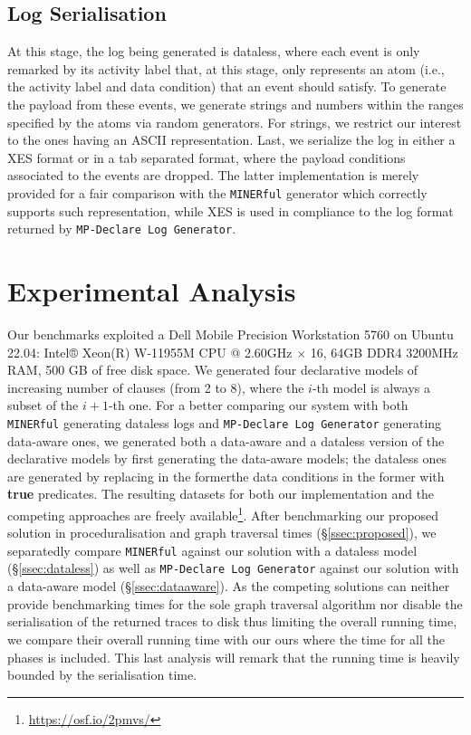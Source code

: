 \documentclass[sigconf]{acmart}
\begin{document}
\subsection{Log Serialisation}\label{sec:loggen}
At this stage, the log being generated is dataless, where each event is only remarked by its activity label that, at this stage, only represents an atom (i.e., the activity label and data condition) that an event should satisfy. To generate the payload from these events, we generate strings and numbers within the ranges specified by the atoms via random generators. For strings, we restrict our interest to the ones having an ASCII representation. Last, we serialize the log in either a XES format or in a tab separated format, where the payload conditions associated to the events are dropped. The latter implementation is merely provided for a fair comparison with the \texttt{MINERful} generator which correctly supports such representation, while XES is used in compliance to the log format returned by \texttt{MP-Declare Log Generator}.

\section{Experimental Analysis}\label{sec:exp}
Our benchmarks exploited a Dell Mobile Precision Workstation 5760 on Ubuntu 22.04: Intel® Xeon(R) W-11955M CPU @ 2.60GHz $\times$ 16, 64GB DDR4 3200MHz RAM, 500 GB of free disk space. We generated four declarative models of increasing number of clauses (from 2 to 8), where the $i$-th model is always a subset of the $i+1$-th one. For a better comparing our system with both \texttt{MINERful} generating dataless logs and
\texttt{MP-Declare Log Generator} generating data-aware ones, we generated both a data-aware and a dataless version of the declarative models by first generating the data-aware models; the dataless ones are generated by replacing in the formerthe data conditions in the former with \textbf{true} predicates. The resulting datasets for both our implementation and the competing approaches are freely available\footnote{\url{https://osf.io/2pmvs/}}. After benchmarking our proposed solution in proceduralisation and graph traversal times (\S\ref{ssec:proposed}), we separatedly compare \texttt{MINERful} against our solution with a dataless model (\S\ref{ssec:dataless}) as well as \texttt{MP-Declare Log Generator} against our solution with a data-aware model (\S\ref{ssec:dataaware}). As the competing solutions can neither provide benchmarking times for the sole graph traversal algorithm nor disable the serialisation of the returned traces to disk thus limiting the overall running time, we compare their overall running time with our ours where the time for all the phases is included. This last analysis will remark that the running time is heavily bounded by the serialisation time.
\end{document}
